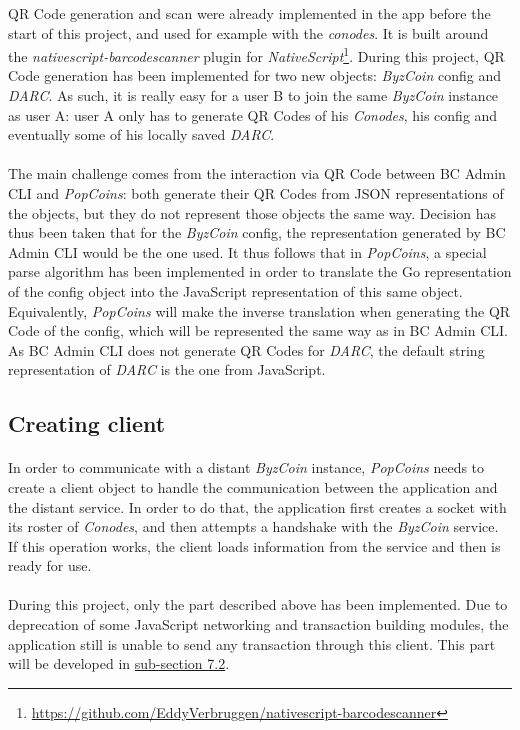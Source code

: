 QR Code generation and scan were already implemented in the app before the start of this project, and used for example with the \textit{conodes}. It is built around the \textit{nativescript-barcodescanner} plugin for \textit{NativeScript}\footnote{\url{https://github.com/EddyVerbruggen/nativescript-barcodescanner}}. During this project, QR Code generation has been implemented for two new objects: \textit{ByzCoin} config and \textit{DARC}. As such, it is really easy for a user B to join the same \textit{ByzCoin} instance as user A: user A only has to generate QR Codes of his \textit{Conodes}, his config and eventually some of his locally saved \textit{DARC}.

\paragraph{}

The main challenge comes from the interaction via QR Code between BC Admin CLI and \textit{PopCoins}: both generate their QR Codes from JSON representations of the objects, but they do not represent those objects the same way. Decision has thus been taken that for the \textit{ByzCoin} config, the representation generated by BC Admin CLI would be the one used. It thus follows that in \textit{PopCoins}, a special parse algorithm has been implemented in order to translate the Go representation of the config object into the JavaScript representation of this same object. Equivalently, \textit{PopCoins} will make the inverse translation when generating the QR Code of the config, which will be represented the same way as in BC Admin CLI. As BC Admin CLI does not generate QR Codes for \textit{DARC}, the default string representation of \textit{DARC} is the one from JavaScript.

\subsection{Creating client}
\label{subsection54}

\paragraph{}

In order to communicate with a distant \textit{ByzCoin} instance, \textit{PopCoins} needs to create a client object to handle the communication between the application and the distant service. In order to do that, the application first creates a socket with its roster of \textit{Conodes}, and then attempts a handshake with the \textit{ByzCoin} service. If this operation works, the client loads information from the service and then is ready for use.

\paragraph{}

During this project, only the part described above has been implemented. Due to deprecation of some JavaScript networking and transaction building modules, the application still is unable to send any transaction through this client. This part will be developed in \hyperref[subsection72]{sub-section 7.2}.